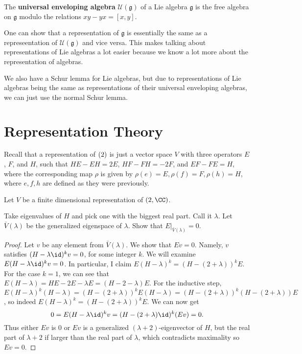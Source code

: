 \documentclass{article}
\begin{document}
\begin{df}
The \textbf{universal enveloping algebra} $\mathcal{U}(\mathfrak{g})$ of a Lie
algebra $\mathfrak{g}$ is the free algebra on $\mathfrak{g}$ modulo the
relations $xy - yx = [x, y]$.
\end{df}

\begin{rem}
One can show that a representation of $\mathfrak{g}$ is essentially the same as
a represeentation of $\mathcal{U}(\mathfrak{g})$ and vice versa. This makes
talking about representations of Lie algebras a lot easier because we know a lot
more about the representation of algebras.
\end{rem}

\begin{rem}
We also have a Schur lemma for Lie algebras, but due to representations of Lie
algebras being the same as representations of their universal enveloping
algebras, we can just use the normal Schur lemma.
\end{rem}

\newpage
\section{Representation Theory}
Recall that a representation of $\sl(2)$ is just a vector space $V$ with three
operators $E$, $F$, and $H$, such that $HE - EH = 2E$, $HF - FH = -2F$, and $EF
- FE = H$, where the corresponding map $\rho$ is given by $\rho(e) = E, \rho(f)
= F, \rho(h) = H$, where $e, f, h$ are defined as they were previously.

Let $V$ be a finite dimensional representation of $\sl(2, \CC)$.

\begin{prop}
Take eigenvalues of $H$ and pick one with the biggest real part. Call it
$\lambda$. Let $\bar{V}(\lambda)$ be the generalized eigenspace of $\lambda$.
Show that $E|_{\bar{V}(\lambda)} = 0$.
\end{prop}

\begin{proof}
Let $v$ be any element from $\bar{V}(\lambda)$. We show that $Ev = 0$. Namely,
$v$ satisfies $(H - \lambda \id)^k v = 0$, for some integer $k$. We will examine
$E(H - \lambda \id)^k v = 0$. In particular, I claim $E(H - \lambda)^k = (H - (2
+ \lambda))^k E$. For the case $k = 1$, we can see that $E(H - \lambda) = HE -
2E - \lambda E = (H - 2 - \lambda) E$. For the inductive step, $E(H - \lambda)^k
(H - \lambda) = (H - (2 + \lambda))^k E (H - \lambda) = (H - (2 + \lambda))^k (H
- (2 + \lambda)) E$, so indeed $E(H - \lambda)^k = (H - (2 + \lambda))^k E$. We
can now get
\[ 0 = E(H - \lambda \id)^k v = (H - (2 + \lambda) \id)^k (Ev) = 0. \]
Thus either $Ev$ is $0$ or $Ev$ is a generalized $(\lambda + 2)$-eigenvector of
$H$, but the real part of $\lambda + 2$ if larger than the real part of
$\lambda$, which contradicts maximality so $Ev = 0$.
\end{proof}
\end{document}
